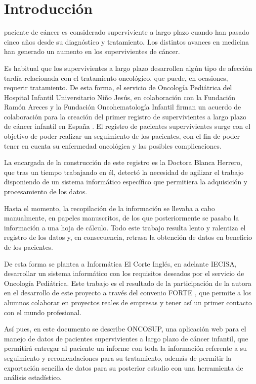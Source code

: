 \chapter{Introducción}

 paciente de cáncer es considerado superviviente a largo plazo cuando han pasado cinco años desde su diagnóstico y tratamiento. Los distintos avances en medicina han generado un aumento en los supervivientes de cáncer.

Es habitual que los supervivientes a largo plazo desarrollen algún tipo de afección tardía relacionada con el tratamiento oncológico, que puede, en ocasiones, requerir tratamiento. De esta forma, el servicio de Oncología Pediátrica del Hospital Infantil Universitario Niño Jesús, en colaboración con la Fundación Ramón Areces y la Fundación Oncohematología Infantil firman un acuerdo de colaboración para la creación del primer registro de supervivientes a largo plazo de cáncer infantil en España \cite{noticiaRegistro}. El registro de pacientes supervivientes surge con el objetivo de poder realizar un seguimiento de los pacientes, con el fin de poder tener en cuenta su enfermedad oncológica y las posibles complicaciones.

La encargada de la construcción de este registro es la Doctora Blanca Herrero, que tras un tiempo trabajando en él, detectó la necesidad de agilizar el trabajo disponiendo de un sistema informático específico que permitiera la adquisición y procesamiento de los datos.

Hasta el momento, la recopilación de la información se llevaba a cabo manualmente, en papeles manuscritos, de los que posteriormente se pasaba la información a una hoja de cálculo. Todo este trabajo resulta lento y ralentiza el registro de los datos y, en consecuencia, retrasa la obtención de datos en beneficio de los pacientes.

De esta forma se plantea a Informática El Corte Inglés, en adelante IECISA, desarrollar un sistema informático con los requisitos deseados por el servicio de Oncología Pediátrica. Este trabajo es el resultado de la participación de la autora en el desarrollo de este proyecto a través del convenio FORTE \cite{forte}, que permite a los alumnos colaborar en proyectos reales de empresas y tener así un primer contacto con el mundo profesional.

Así pues, en este documento se describe ONCOSUP, una aplicación web para el manejo de datos de pacientes supervivientes a largo plazo de cáncer infantil, que permitirá  entregar al paciente un informe con toda la información referente a su seguimiento y recomendaciones para su tratamiento, además de permitir la exportación sencilla de datos para su posterior estudio con una herramienta de análisis estadístico.
